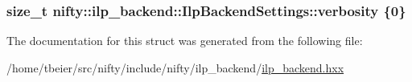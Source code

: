 \subsubsection[{verbosity}]{\setlength{\rightskip}{0pt plus 5cm}size\+\_\+t nifty\+::ilp\+\_\+backend\+::\+Ilp\+Backend\+Settings\+::verbosity \{0\}}\label{structnifty_1_1ilp__backend_1_1IlpBackendSettings_aecafa6adf4695088d0396f232bbe88ba}


The documentation for this struct was generated from the following file\+:\begin{DoxyCompactItemize}
\item 
/home/tbeier/src/nifty/include/nifty/ilp\+\_\+backend/\hyperlink{ilp__backend_8hxx}{ilp\+\_\+backend.\+hxx}\end{DoxyCompactItemize}
